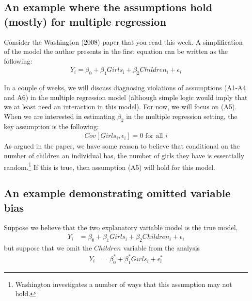 \documentclass{article}
\begin{document}
\subsection{An example where the assumptions hold (mostly) for multiple regression} 

Consider the Washington (2008) paper that you read this week. A simplification of the model the author presents in the first equation can be written as the following:
\begin{align*}
Y_i = \beta_0 + \beta_1 Girls_i + \beta_2 Children_i + \epsilon_i
\end{align*}

In a couple of weeks, we will discuss diagnosing violations of assumptions (A1-A4 and A6) in the multiple regression model (although simple logic would imply that we at least need an interaction in this model). For now, we will focus on (A5). When we are interested in estimating $\beta_2$ in the multiple regression setting, the key assumption is the following:
\begin{align*}
Cov[Girls_i,\epsilon_i]=0 \text{ for all } i
\end{align*}
As argued in the paper, we have some reason to believe that conditional on the number of children an individual has, the number of girls they have is essentially random.\footnote{Washington investigates a number of ways that this assumption may not hold.} If this is true, then assumption (A5) will hold for this model. 


\subsection{An example demonstrating omitted variable bias}

Suppose we believe that the two explanatory variable model is the true model,
\begin{align*}
Y_i &= \beta_0 + \beta_1 Girls_i + \beta_2 Children_i + \epsilon_i
\end{align*}
but suppose that we omit the $Children$ variable from the analysis
 \begin{align*}
Y_i &= \beta_0^{*} + \beta_1^{*} Girls_i + \epsilon_i^{*}
\end{align*}
\end{document}
